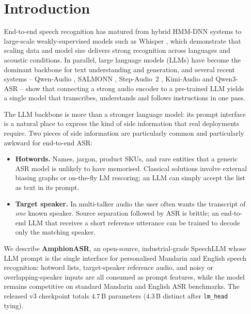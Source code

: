\section{Introduction}
\label{sec:intro}

End-to-end speech recognition has matured from hybrid HMM-DNN systems
\cite{hinton2012deep} to large-scale weakly-supervised models such as
Whisper \cite{radford2023whisper}, which demonstrate that scaling data
and model size delivers strong recognition across languages and acoustic
conditions. In parallel, large language models (LLMs) have become the
dominant backbone for text understanding and generation, and several
recent systems -- Qwen-Audio \cite{chu2023qwenaudio},
SALMONN \cite{tang2024salmonn}, Step-Audio~2 \cite{stepaudio22025},
Kimi-Audio \cite{kimiaudio2025} and Qwen3-ASR \cite{qwen2025qwen3asr}
-- show that connecting a strong audio encoder to a pre-trained LLM
yields a single model that transcribes, understands and follows
instructions in one pass.

The LLM backbone is more than a stronger language model: its prompt
interface is a natural place to express the kind of side information
that real deployments require. Two pieces of side information are
particularly common and particularly awkward for end-to-end ASR:

\begin{itemize}
  \item \textbf{Hotwords.} Names, jargon, product SKUs, and rare
        entities that a generic ASR model is unlikely to have memorised.
        Classical solutions involve external biasing graphs or
        on-the-fly LM rescoring; an LLM can simply accept the list as
        text in its prompt.
  \item \textbf{Target speaker.} In multi-talker audio the user often
        wants the transcript of \emph{one} known speaker. Source
        separation followed by ASR is brittle; an end-to-end LLM that
        receives a short reference utterance can be trained to decode
        only the matching speaker.
\end{itemize}

We describe \textbf{AmphionASR}, an open-source, industrial-grade
SpeechLLM whose LLM prompt is the single interface for personalised
Mandarin and English speech recognition: hotword lists,
target-speaker reference audio, and noisy or overlapping-speaker
inputs are all consumed as prompt features, while the model remains
competitive on standard Mandarin and English ASR benchmarks. The
released v3 checkpoint totals $4.7$\,B parameters ($4.3$\,B distinct
after \texttt{lm\_head} tying).

